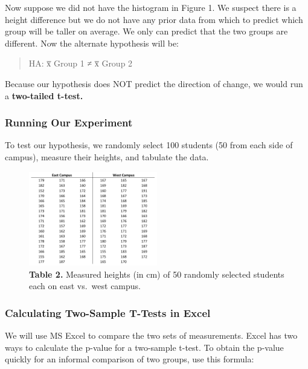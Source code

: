 \documentclass[
]{book}
\begin{document}
Now suppose we did not have the histogram in Figure 1. We suspect there is a height difference but we do not have any prior data from which to predict which group will be taller on average. We only can predict that the two groups are different. Now the alternate hypothesis will be:

\begin{quote}
HA: x̅ Group 1 ≠ x̅ Group 2
\end{quote}

Because our hypothesis does NOT predict the direction of change, we would run a \textbf{two-tailed t-test.}

\hypertarget{running-our-experiment}{%
\subsubsection{Running Our Experiment}\label{running-our-experiment}}

To test our hypothesis, we randomly select 100 students (50 from each side of campus), measure their heights, and tabulate the data.

\begin{figure}
\centering
\includegraphics[width=0.5\textwidth,height=\textheight]{images/Height_table1.png}
\caption{\textbf{Table 2.} Measured heights (in cm) of 50 randomly selected students each on east vs.~west campus.}
\end{figure}

\hypertarget{calculating-two-sample-t-tests-in-excel}{%
\subsubsection{Calculating Two-Sample T-Tests in Excel}\label{calculating-two-sample-t-tests-in-excel}}

We will use MS Excel to compare the two sets of measurements. Excel has two ways to calculate the p-value for a two-sample t-test. To obtain the p-value quickly for an informal comparison of two groups, use this formula:
\end{document}
